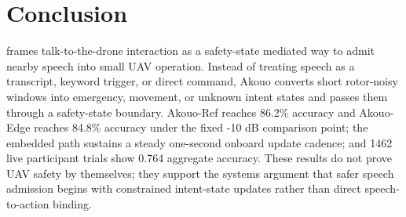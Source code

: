 \section{Conclusion}
\label{sec:conclusion}

\sys{} frames talk-to-the-drone interaction as a safety-state mediated way to admit nearby speech into small UAV operation. Instead of treating speech as a transcript, keyword trigger, or direct command, Akouo converts short rotor-noisy windows into emergency, movement, or unknown intent states and passes them through a safety-state boundary. Akouo-Ref reaches 86.2\% accuracy and Akouo-Edge reaches 84.8\% accuracy under the fixed -10 dB comparison point; the embedded path sustains a steady one-second onboard update cadence; and 1462 live participant trials show 0.764 aggregate accuracy. These results do not prove UAV safety by themselves; they support the systems argument that safer speech admission begins with constrained intent-state updates rather than direct speech-to-action binding.
